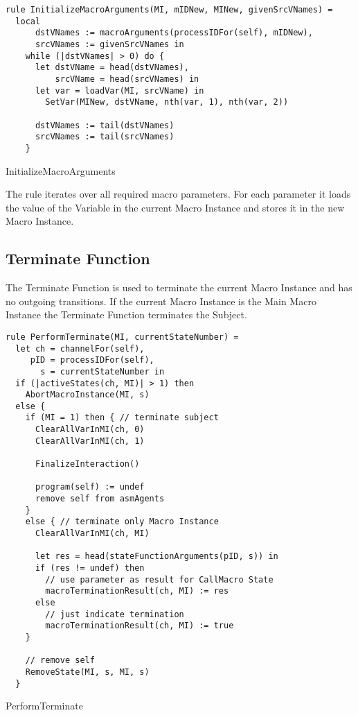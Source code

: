 \begin{listing}[htbp]
\begin{verbatim}
rule InitializeMacroArguments(MI, mIDNew, MINew, givenSrcVNames) =
  local
      dstVNames := macroArguments(processIDFor(self), mIDNew),
      srcVNames := givenSrcVNames in
    while (|dstVNames| > 0) do {
      let dstVName = head(dstVNames),
          srcVName = head(srcVNames) in
      let var = loadVar(MI, srcVName) in
        SetVar(MINew, dstVName, nth(var, 1), nth(var, 2))

      dstVNames := tail(dstVNames)
      srcVNames := tail(srcVNames)
    }
\end{verbatim}
\caption{InitializeMacroArguments}
\label{lst:shortasm:InitializeMacroArguments}
\end{listing}


The  rule iterates over all required macro parameters. For each parameter it loads the value of the Variable in the current Macro Instance and stores it in the new Macro Instance.


\subsection{Terminate Function}

The Terminate Function is used to terminate the current Macro Instance and has no outgoing transitions. If the current Macro Instance is the Main Macro Instance the Terminate Function terminates the Subject.


\begin{listing}[htbp]
\begin{verbatim}
rule PerformTerminate(MI, currentStateNumber) =
  let ch = channelFor(self),
     pID = processIDFor(self),
       s = currentStateNumber in
  if (|activeStates(ch, MI)| > 1) then
    AbortMacroInstance(MI, s)
  else {
    if (MI = 1) then { // terminate subject
      ClearAllVarInMI(ch, 0)
      ClearAllVarInMI(ch, 1)

      FinalizeInteraction()

      program(self) := undef
      remove self from asmAgents
    }
    else { // terminate only Macro Instance
      ClearAllVarInMI(ch, MI)

      let res = head(stateFunctionArguments(pID, s)) in
      if (res != undef) then
        // use parameter as result for CallMacro State
        macroTerminationResult(ch, MI) := res
      else
        // just indicate termination
        macroTerminationResult(ch, MI) := true
    }

    // remove self
    RemoveState(MI, s, MI, s)
  }
\end{verbatim}
\caption{PerformTerminate}
\label{lst:shortasm:PerformTerminate}
\end{listing}


